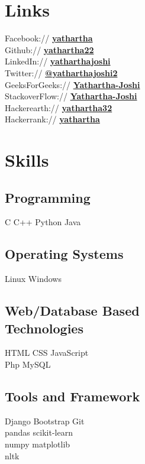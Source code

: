 \documentclass[]{deedy-resume-openfont}
\begin{document}
\begin{minipage}[t]{0.33\textwidth}
\section{Links} 
Facebook:// \href{https://www.facebook.com/yathartha.joshi.399}{\bf yathartha} \\
Github:// \href{https://github.com/Yathartha22}{\bf yathartha22} \\
LinkedIn://  \href{https://www.linkedin.com/in/yathartha-joshi-962701123}{\bf yatharthajoshi} \\
Twitter://  \href{https://twitter.com/yatharthajoshi2}{\bf @yatharthajoshi2} \\
GeeksForGeeks://  \href{https://auth.geeksforgeeks.org/user/YatharthaJoshi/}{\bf Yathartha-Joshi} \\
StackoverFlow://  \href{https://stackoverflow.com/users/6446166/yathartha-joshi}{\bf Yathartha-Joshi} \\
Hackerearth://  \href{https://www.hackerearth.com/@yathartha32}{\bf yathartha32} \\
Hackerrank://  \href{https://www.hackerrank.com/yathartha}{\bf yathartha}


\section{Skills}
\subsection{Programming}
C \textbullet{}   C++ \textbullet{} Python \textbullet{} Java
\subsection{Operating Systems}
Linux \textbullet{} Windows
\subsection{Web/Database Based \\ Technologies}
HTML \textbullet{} CSS \textbullet{} JavaScript \\
\textbullet{} Php \textbullet{} MySQL
\subsection{Tools and Framework}
Django \textbullet{} Bootstrap  \textbullet{} Git \\
\textbullet{} pandas \textbullet{} scikit-learn \\
\textbullet{} numpy \textbullet{} matplotlib \\
\textbullet{} nltk
\sectionsep

%
%

\end{minipage} 
\end{document}
